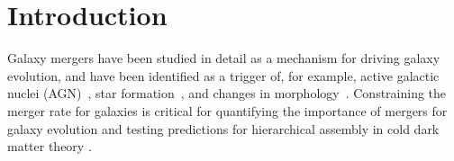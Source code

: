 \documentclass[twocolumn]{aastex631}
\begin{document}
\begin{abstract}
\end{abstract}

\section{Introduction} \label{sec:intro}
    Galaxy mergers have been studied in detail as a mechanism for driving galaxy evolution, and have been identified as a trigger of, for example, 
    active galactic nuclei (AGN)~\citep[e.g.][]{Hopkins2008,Treister2010,Ramos2011,Satyapal2014,Comerford2015,Glikman2015,Blecha2018,Ellison2019}, 
    star formation~\citep[e.g.][]{Mihos1996, DiMatteo2008,Ellison2011,Patton2013, Hopkins2013,Martin2017,Patton2020,Hani2020,Martin2021}, 
    and changes in morphology~\citep[e.g.][]{Conselice2003,Lotz2008,Casteels2014,Patton2016,Bignone2017,RG2017,Martin2018,Jackson2019,Snyder2019,Jackson2022,Guzman-Ortega2023}. 
    Constraining the merger rate for galaxies is critical for quantifying the importance of mergers for galaxy evolution and testing predictions for hierarchical assembly in cold dark matter theory \citep[e.g.][]{Stewart2009,Hopkins2010,RG2015}.
\end{document}
